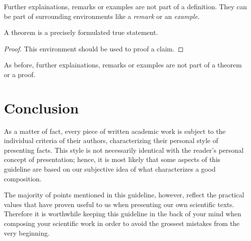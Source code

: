 \begin{remark}
  Further explainations, remarks or examples are not part of a definition.
  They can be part of surrounding environments like a \emph{remark} or an \emph{example}.
\end{remark}


\begin{theorem}
  A theorem is a precisely formulated true statement.
\end{theorem}


\begin{proof}
  This environment should be used to proof a claim.
\end{proof}


\begin{remark}
  As before, further explainations, remarks or examples are not part of a theorem or a proof.
\end{remark}


\chapter{Conclusion}

As a matter of fact, every piece of written academic work is subject
to the individual criteria of their authors, characterizing their personal 
style of presenting facts. This style is not necessarily identical with the 
reader's personal concept of presentation; hence, it is most likely that some 
aspects of this guideline are based on our subjective idea of what 
characterizes a good composition. 

The majority of points mentioned in this guideline, however, reflect the 
practical values that have proven useful to us when presenting our own 
scientific texts. Therefore it is worthwhile keeping this guideline in the 
back of your mind when composing your scientific work in order to avoid the 
grossest mistakes from the very beginning.


